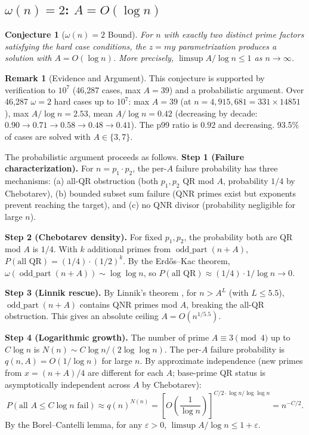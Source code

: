 \documentclass[11pt,a4paper]{article}
\theoremstyle{plain}
\theoremstyle{plain}
\newtheorem{conjecture}[theorem]{Conjecture}
\theoremstyle{definition}
\newtheorem{remark}[theorem]{Remark}
\numberwithin{equation}{section}
\begin{document}
\subsection{\texorpdfstring{$\omega(n) = 2$}{omega(n) = 2}: \texorpdfstring{$A = O(\log n)$}{A = O(log n)}}

\begin{conjecture}[$\omega(n) = 2$ Bound]\label{conj:omega2}
For $n$ with exactly two distinct prime factors satisfying the hard case conditions, the $z = my$ parametrization produces a solution with $A = O(\log n)$. More precisely, $\limsup A/\log n \leq 1$ as $n \to \infty$.
\end{conjecture}

\begin{remark}[Evidence and Argument]
This conjecture is supported by verification to $10^7$ (46,287 cases, max $A = 39$) and a probabilistic argument. Over 46,287 $\omega = 2$ hard cases up to $10^7$: max $A = 39$ (at $n = 4{,}915{,}681 = 331 \times 14851$), max $A/\log n = 2.53$, mean $A/\log n = 0.42$ (decreasing by decade: $0.90 \to 0.71 \to 0.58 \to 0.48 \to 0.41$). The p99 ratio is $0.92$ and decreasing. 93.5\% of cases are solved with $A \in \{3, 7\}$.

The probabilistic argument proceeds as follows. \textbf{Step 1 (Failure characterization).} For $n = p_1 \cdot p_2$, the per-$A$ failure probability has three mechanisms: (a) all-QR obstruction (both $p_1, p_2$ QR mod $A$, probability $1/4$ by Chebotarev), (b) bounded subset sum failure (QNR primes exist but exponents prevent reaching the target), and (c) no QNR divisor (probability negligible for large $n$).

\textbf{Step 2 (Chebotarev density).} For fixed $p_1, p_2$, the probability both are QR mod $A$ is $1/4$. With $k$ additional primes from $\operatorname{odd\_part}(n+A)$, $P(\text{all QR}) = (1/4) \cdot (1/2)^k$. By the Erd\H{o}s--Kac theorem, $\omega(\operatorname{odd\_part}(n+A)) \sim \log\log n$, so $P(\text{all QR}) \approx (1/4) \cdot 1/\log n \to 0$.

\textbf{Step 3 (Linnik rescue).} By Linnik's theorem \cite{Xylouris2011}, for $n > A^L$ (with $L \leq 5.5$), $\operatorname{odd\_part}(n+A)$ contains QNR primes mod $A$, breaking the all-QR obstruction. This gives an absolute ceiling $A = O(n^{1/5.5})$.

\textbf{Step 4 (Logarithmic growth).} The number of prime $A \equiv 3 \pmod{4}$ up to $C \log n$ is $N(n) \sim C\log n / (2\log\log n)$. The per-$A$ failure probability is $q(n, A) = O(1/\log n)$ for large $n$. By approximate independence (new primes from $x = (n+A)/4$ are different for each $A$; base-prime QR status is asymptotically independent across $A$ by Chebotarev):
\begin{equation}
P(\text{all } A \leq C\log n \text{ fail}) \approx q(n)^{N(n)} = \left[O\!\left(\frac{1}{\log n}\right)\right]^{C/2 \cdot \log n / \log\log n} = n^{-C/2}.
\end{equation}
By the Borel--Cantelli lemma, for any $\varepsilon > 0$, $\limsup A/\log n \leq 1 + \varepsilon$.


\end{remark}
\end{document}
